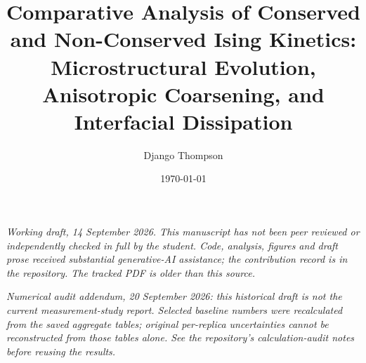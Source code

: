 \documentclass[11pt]{article}
\title{Comparative Analysis of Conserved and Non-Conserved Ising Kinetics: \\
Microstructural Evolution, Anisotropic Coarsening, and Interfacial Dissipation}
\author{Django Thompson}
\date{\today}
\begin{document}
\maketitle

\noindent\textit{Working draft, 14 September 2026. This manuscript has not
been peer reviewed or independently checked in full by the student. Code,
analysis, figures and draft prose received substantial generative-AI
assistance; the contribution record is in the repository. The tracked PDF is
older than this source.}

\noindent\textit{Numerical audit addendum, 20 September 2026: this historical
draft is not the current measurement-study report. Selected baseline numbers
were recalculated from the saved aggregate tables; original per-replica
uncertainties cannot be reconstructed from those tables alone. See the
repository's calculation-audit notes before reusing the results.}
\end{document}
